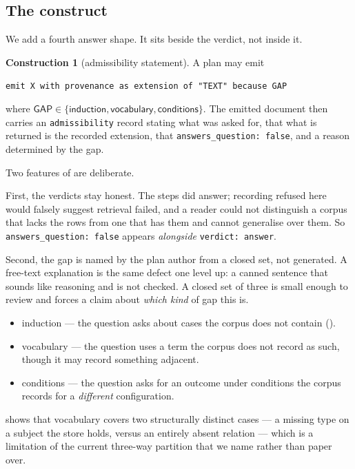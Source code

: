 \documentclass[11pt,a4paper]{article}
\theoremstyle{plain}
\theoremstyle{definition}
\newtheorem{construction}[theorem]{Construction}
\theoremstyle{remark}
\newcommand{\vref}{\textsf{refused}}
\begin{document}
\subsection{The construct}

We add a fourth answer shape. It sits beside the verdict, not inside
it.

\begin{construction}[admissibility statement]
\label{con:admiss}
A plan may emit
\begin{center}
\texttt{emit X with provenance as extension of "TEXT" because GAP}
\end{center}
where $\textsf{GAP} \in \{\textsf{induction}, \textsf{vocabulary},
\textsf{conditions}\}$. The emitted document then carries an
\texttt{admissibility} record stating what was asked for, that what is
returned is the recorded extension, that
\texttt{answers\_question: false}, and a reason determined by the gap.
\end{construction}

Two features of  are deliberate.

First, the verdicts stay honest. The steps did answer; recording
\vref{} here would falsely suggest retrieval failed, and a reader could
not distinguish a corpus that lacks the rows from one that has them and
cannot generalise over them. So \texttt{answers\_question: false}
appears \emph{alongside} \texttt{verdict: answer}.

Second, the gap is named by the plan author from a closed set, not
generated. A free-text explanation is the same defect one level up: a
canned sentence that sounds like reasoning and is not checked. A closed
set of three is small enough to review and forces a claim about
\emph{which kind} of gap this is.

\begin{itemize}[leftmargin=1.6em]
\item \textsf{induction} --- the question asks about cases the corpus
  does not contain ().
\item \textsf{vocabulary} --- the question uses a term the corpus does
  not record as such, though it may record something adjacent.
\item \textsf{conditions} --- the question asks for an outcome under
  conditions the corpus records for a \emph{different} configuration.
\end{itemize}

 shows that \textsf{vocabulary} covers two structurally
distinct cases --- a missing type on a subject the store holds, versus
an entirely absent relation --- which is a limitation of the current
three-way partition that we name rather than paper over.
\end{document}
